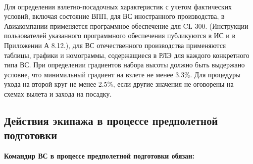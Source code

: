\paragraph{} Для определения взлетно-посадочных характеристик с учетом фактических условий, включая состояние ВПП, для ВС иностранного производства, в Авиакомпании применяется программное обеспечение для CL-300. (Инструкции пользователей указанного программного обеспечения публикуются в ИС и в Приложении А 8.12.), для ВС отечественного производства применяются таблицы, графики и номограммы, содержащиеся в РЛЭ для каждого конкретного типа ВС.
При определении градиентов набора высоты должно быть выдержано условие, что минимальный градиент на взлете не менее 3.3\%. Для процедуры ухода на второй круг не менее 2.5\%, если другие значения не оговорены на схемах вылета и захода на посадку. 

\subsection{Действия экипажа в процессе предполетной подготовки}


\textbf{Командир ВС в процессе предполетной подготовки обязан:}


